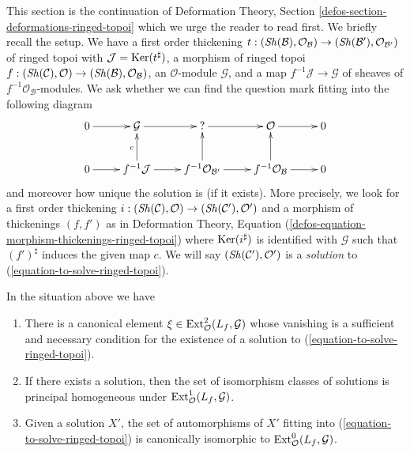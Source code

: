 \noindent
This section is the continuation of
Deformation Theory, Section \ref{defos-section-deformations-ringed-topoi}
which we urge the reader to read first. We briefly recall the setup.
We have a first order thickening
$t : (\mathop{\mathit{Sh}}\nolimits(\mathcal{B}), \mathcal{O}_\mathcal{B}) \to
(\mathop{\mathit{Sh}}\nolimits(\mathcal{B}'), \mathcal{O}_{\mathcal{B}'})$ of ringed topoi
with $\mathcal{J} = \mathop{\mathrm{Ker}}(t^\sharp)$, a morphism of ringed topoi
$f : (\mathop{\mathit{Sh}}\nolimits(\mathcal{C}), \mathcal{O}) \to
(\mathop{\mathit{Sh}}\nolimits(\mathcal{B}), \mathcal{O}_\mathcal{B})$, an $\mathcal{O}$-module
$\mathcal{G}$, and a map $f^{-1}\mathcal{J} \to \mathcal{G}$
of sheaves of $f^{-1}\mathcal{O}_\mathcal{B}$-modules.
We ask whether we can find
the question mark fitting into the following diagram
\begin{equation}
\label{equation-to-solve-ringed-topoi}
\vcenter{
\xymatrix{
0 \ar[r] & \mathcal{G} \ar[r] & {?} \ar[r] & \mathcal{O} \ar[r] & 0 \\
0 \ar[r] & f^{-1}\mathcal{J} \ar[u]^c \ar[r] &
f^{-1}\mathcal{O}_{\mathcal{B}'} \ar[u] \ar[r] &
f^{-1}\mathcal{O}_\mathcal{B} \ar[u] \ar[r] & 0
}
}
\end{equation}
and moreover how unique the solution is (if it exists). More precisely,
we look for a first order thickening
$i : (\mathop{\mathit{Sh}}\nolimits(\mathcal{C}), \mathcal{O}) \to (\mathop{\mathit{Sh}}\nolimits(\mathcal{C}'), \mathcal{O}')$
and a morphism of thickenings $(f, f')$ as in
Deformation Theory, Equation
(\ref{defos-equation-morphism-thickenings-ringed-topoi})
where $\mathop{\mathrm{Ker}}(i^\sharp)$ is identified with $\mathcal{G}$
such that $(f')^\sharp$ induces the given map $c$.
We will say $(\mathop{\mathit{Sh}}\nolimits(\mathcal{C}'), \mathcal{O}')$ is a {\it solution} to
(\ref{equation-to-solve-ringed-topoi}).

\begin{lemma}
\label{lemma-find-obstruction-ringed-topoi}
In the situation above we have
\begin{enumerate}
\item There is a canonical element
$\xi \in \mathop{\mathrm{Ext}}\nolimits^2_\mathcal{O}(L_f, \mathcal{G})$
whose vanishing is a sufficient and necessary condition for the existence
of a solution to (\ref{equation-to-solve-ringed-topoi}).
\item If there exists a solution, then the set of
isomorphism classes of solutions is principal homogeneous under
$\mathop{\mathrm{Ext}}\nolimits^1_\mathcal{O}(L_f, \mathcal{G})$.
\item Given a solution $X'$, the set of automorphisms of $X'$
fitting into (\ref{equation-to-solve-ringed-topoi}) is canonically isomorphic
to $\mathop{\mathrm{Ext}}\nolimits^0_\mathcal{O}(L_f, \mathcal{G})$.
\end{enumerate}
\end{lemma}

